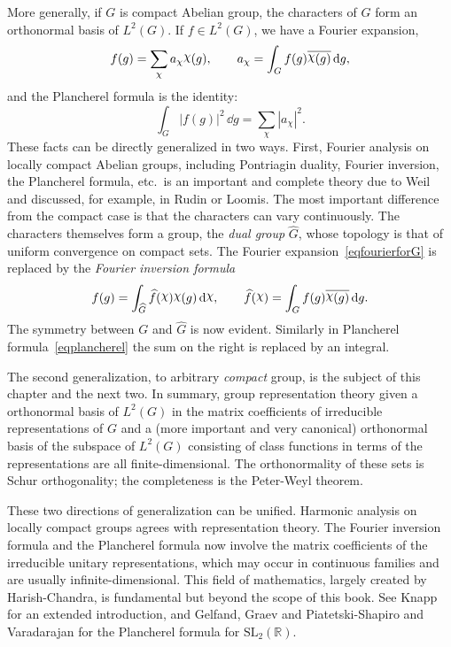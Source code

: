 \documentclass[12pt,reqno]{book}%
\theoremstyle{definition}
\theoremstyle{remark}
\theoremstyle{theorem}
\theoremstyle{remark}
\newcommand{\mychi}{\raisebox{2pt}{$\chi$}}
\renewcommand{\d}{\dd}
\begin{document}
More generally, if $G$ is compact Abelian group, the characters of $G$ form an orthonormal basis of $L^2(G)$.
If $f \in L^2(G)$, we have a Fourier expansion,
\begin{equation}\label{eqfourierforG}
    f(g) = \sum_{\chi} a_{\chi} \mychi(g), \qquad a_{\chi} = \int_{G} f(g) \overline{\mychi(g)} \, \d g,
\end{equation}
and the Plancherel formula is the identity:
\begin{equation}\label{eqplancherel}
    \int_{G} |f(g)|^2 \, \d g = \sum_{\chi} |a_{\chi}|^2.
\end{equation}
These facts can be directly generalized in two ways.
First, Fourier analysis on locally compact Abelian groups, including Pontriagin duality, Fourier inversion, the Plancherel formula, etc.\ is an important and complete theory due to Weil and discussed, for example, in Rudin or Loomis.
The most important difference from the compact case is that the characters can vary continuously.
The characters themselves form a group, the \emph{dual group} $\widehat{G}$, whose topology is that of uniform convergence on compact sets.
The Fourier expansion~\eqref{eqfourierforG} is replaced by the \emph{Fourier inversion formula}
\[
    f(g) = \int_{\widehat{G}} \widehat{f}(\mychi) \mychi(g) \, \d\mychi, \qquad \widehat{f}(\mychi) = \int_{G} f(g) \overline{\mychi(g)} \, \d g.
\]
The symmetry between $G$ and $\widehat{G}$ is now evident.
Similarly in Plancherel formula~\eqref{eqplancherel} the sum on the right is replaced by an integral.

The second generalization, to arbitrary \emph{compact} group, is the subject of this chapter and the next two.
In summary, group representation theory given a orthonormal basis of $L^2(G)$ in the matrix coefficients of irreducible representations of $G$ and a (more important and very canonical) orthonormal basis of the subspace of $L^2(G)$ consisting of class functions in terms of the representations are all finite-dimensional.
The orthonormality of these sets is Schur orthogonality; the completeness is the Peter-Weyl theorem.

These two directions of generalization can be unified.
Harmonic analysis on locally compact groups agrees with representation theory.
The Fourier inversion formula and the Plancherel formula now involve the matrix coefficients of the irreducible unitary representations, which may occur in continuous families and are usually infinite-dimensional.
This field of mathematics, largely created by Harish-Chandra, is fundamental but beyond the scope of this book.
See Knapp for an extended introduction, and Gelfand, Graev and Piatetski-Shapiro and Varadarajan for the Plancherel formula for $\mathrm{SL}_{2}(\mathbb{R})$.
\end{document}
